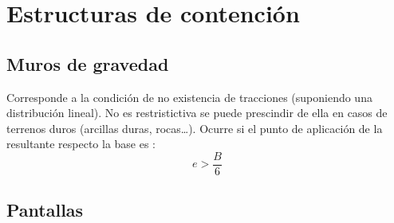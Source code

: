 \section{Estructuras de contención} %
\label{sec:estructuras_de_contención}

\subsection{Muros de gravedad} %
\label{sub:muros_de_gravedad}

\begin{mydef}
	Corresponde a la condición de no existencia de tracciones (suponiendo una distribución lineal). No es restristictiva se puede prescindir de ella en casos de terrenos duros (arcillas duras, rocas…). Ocurre si el punto de aplicación de la resultante respecto la base es :
	\[
		e> \frac{B}{6}
	\]
\end{mydef}


\subsection{Pantallas} %
\label{sub:pantallas}

